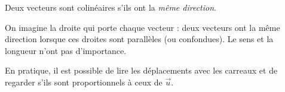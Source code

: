 \documentclass[border=4pt]{standalone}
\begin{document}
\begin{minipage}{8.5cm}\large \colorbox{orange!8}{\begin{minipage}{8.2cm}\par Deux vecteurs sont colinéaires s'ils ont la \textit{même direction}.\par On imagine la droite qui porte chaque vecteur : deux vecteurs ont la même direction lorsque ces droites sont parallèles (ou confondues). Le sens et la longueur n'ont pas d'importance.\par En pratique, il est possible de lire les déplacements avec les carreaux et de regarder s'ils sont proportionnels à ceux de $\vec{u}$.\vspace{4pt}\end{minipage}}\end{minipage}
\end{document}
